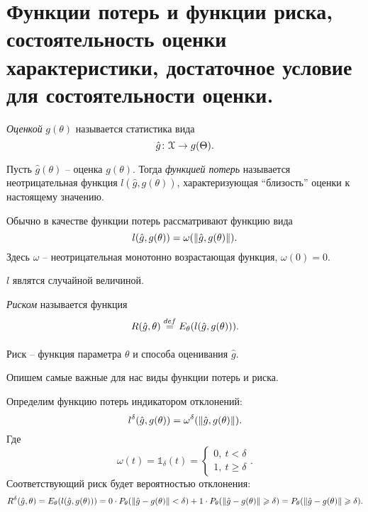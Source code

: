 \section{Функции потерь и функции риска, состоятельность оценки характеристики, 
достаточное условие для состоятельности оценки.}

\begin{definition}
	\textit{Оценкой} $g(\theta)$ называется статистика вида
	\[
		\hat{g} \colon \mathcal{X} \to g(\Theta)
	.\]
\end{definition}

\begin{definition}
	Пусть $\hat{g}(\theta)$ -- оценка $g(\theta)$. Тогда \textit{функцией
	потерь} называется неотрицательная функция $l(\hat{g}, g(\theta))$, 
	характеризующая ``близость'' оценки к настоящему значению.
\end{definition}

\begin{remark}
	Обычно в качестве функции потерь рассматривают функцию вида
	\[
		l(\hat{g}, g(\theta)) = \omega(\lVert\hat{g}, g(\theta)\rVert)
	.\]
	Здесь $\omega$ -- неотрицательная монотонно возрастающая функция,
	$\omega(0) = 0$.
\end{remark}

\begin{remark}
	$l$ являтся случайной величиной.
\end{remark}

\begin{definition}
	\textit{Риском} называется функция
	\[
		R(\hat{g}, \theta) \overset{def}{\underset{}{=}} E_{\theta}(l(\hat{g}, g(\theta))) 
	.\]
\end{definition}

\begin{remark}
	Риск -- функция параметра $\theta$ и способа оценивания $\hat{g}$.
\end{remark}

Опишем самые важные для нас виды функции потерь и риска.

\begin{definition}
	Определим функцию потерь индикатором отклонений:
	\[
		l^\delta(\hat{g}, g(\theta)) = \omega^\delta(\lVert\hat{g}, g(\theta)\rVert)
	.\] 
	Где
	\[
		\omega(t) = \mathbb{1}_\delta(t) = \begin{cases}
			0,~ t < \delta  \\
			1,~ t \geqslant \delta
		\end{cases}
	.\]
	Соответствующий риск будет вероятностью отклонения:
	\[
		R^\delta(\hat{g}, \theta) = E_{\theta}(l(\hat{g}, g(\theta))) =
	0 \cdot P_\theta(\lVert\hat{g} - g(\theta)\rVert < \delta) +
	1 \cdot P_\theta(\lVert\hat{g} - g(\theta)\rVert \geqslant \delta) =
	P_\theta(\lVert\hat{g} - g(\theta)\rVert \geqslant \delta)
	.\]
\end{definition}

